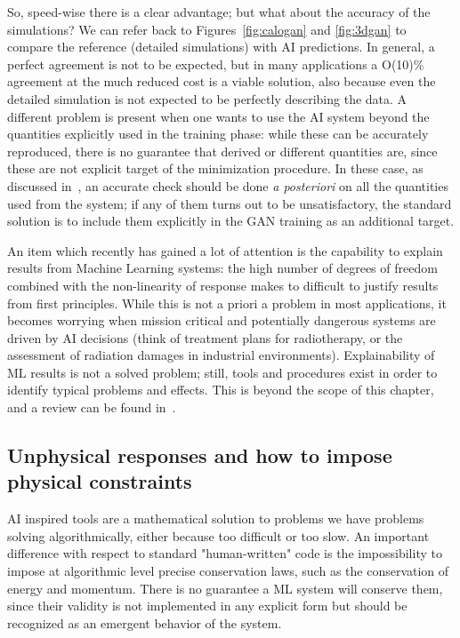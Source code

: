 So, speed-wise there is a clear advantage; but what about the accuracy of the simulations? 
We can refer back to Figures~\ref{fig:calogan} and \ref{fig:3dgan} to compare the reference (detailed simulations) with AI predictions. In general, a perfect agreement is not to be expected, but in many applications a O(10)\% agreement at the much reduced cost is a viable solution, also because even the detailed simulation is not expected to be perfectly describing the data. A different problem is present when one wants to use the AI system beyond the quantities explicitly used in the training phase: while these can be accurately reproduced, there is no guarantee that derived or different quantities are, since these are not explicit target of the minimization procedure. In these case, as discussed in~\cite{calogan}, an accurate check should be done \emph{a posteriori} on all the quantities used from the system; if any of them turns out to be unsatisfactory, the standard solution is to include them explicitly in the GAN training as an additional target.

An item which recently has gained a lot of attention is the capability to explain results from Machine Learning systems: the high number of degrees of freedom combined with the non-linearity of response makes to difficult to justify results from first principles. While this is not a priori a problem in most applications, it becomes worrying when mission critical and potentially dangerous systems are driven by AI decisions (think of treatment plans for radiotherapy, or the assessment of radiation damages in industrial environments). Explainability of ML results is not a solved problem;  still, tools and procedures exist in order to identify typical problems and effects. This is beyond the scope of this chapter, and a review can be found  in~\cite{explain}. 


\subsection{Unphysical responses and how to impose physical constraints}
\label{subsec:physical}
AI inspired tools are a mathematical solution to problems we have problems solving algorithmically, either because too difficult or too slow.
An important difference with respect to standard "human-written" code is the impossibility to impose at algorithmic level precise conservation laws, such as the conservation of energy and momentum.
There is no guarantee a ML system will conserve them, since their validity is not implemented in any explicit form but should be recognized  as an emergent behavior of the system.

